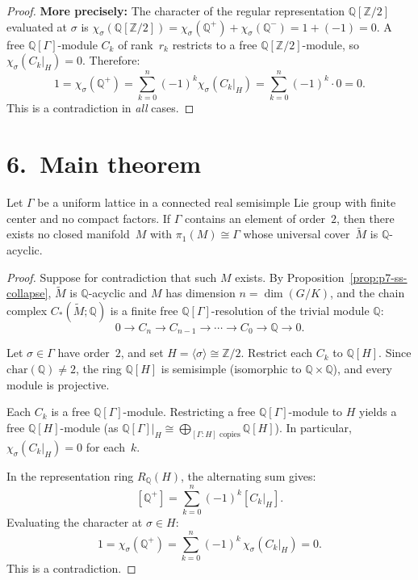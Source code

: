 \begin{proof}
\textbf{More precisely:} The character of the regular representation
$\mathbb{Q}[\mathbb{Z}/2]$ evaluated at $\sigma$ is
$\chi_\sigma(\mathbb{Q}[\mathbb{Z}/2]) = \chi_\sigma(\mathbb{Q}^+) +
\chi_\sigma(\mathbb{Q}^-) = 1 + (-1) = 0$. A free
$\mathbb{Q}[\Gamma]$-module $C_k$ of rank~$r_k$ restricts to a free
$\mathbb{Q}[\mathbb{Z}/2]$-module, so $\chi_\sigma(C_k|_H) = 0$. Therefore:
\[
  1 = \chi_\sigma(\mathbb{Q}^+)
  = \sum_{k=0}^n (-1)^k \chi_\sigma(C_k|_H)
  = \sum_{k=0}^n (-1)^k \cdot 0 = 0.
\]
This is a contradiction in \emph{all} cases.
\end{proof}

\section*{6.\ Main theorem}
\label{sec:p7-main}

\begin{theorem}
\label{thm:p7-main}
Let $\Gamma$ be a uniform lattice in a connected real semisimple Lie group
with finite center and no compact factors. If $\Gamma$ contains an element of
order~$2$, then there exists no closed manifold~$M$ with
$\pi_1(M)\cong\Gamma$ whose universal cover~$\widetilde{M}$ is
$\mathbb{Q}$-acyclic.
\end{theorem}

\begin{proof}
Suppose for contradiction that such $M$ exists. By
Proposition~\ref{prop:p7-ss-collapse}, $\widetilde{M}$ is
$\mathbb{Q}$-acyclic and $M$ has dimension $n=\dim(G/K)$, and the chain
complex $C_*(\widetilde{M};\mathbb{Q})$ is a finite free
$\mathbb{Q}[\Gamma]$-resolution of the trivial module $\mathbb{Q}$:
\[
  0 \to C_n \to C_{n-1} \to \cdots \to C_0 \to \mathbb{Q} \to 0.
\]

Let $\sigma\in\Gamma$ have order~$2$, and set $H=\langle\sigma\rangle\cong
\mathbb{Z}/2$.  Restrict each $C_k$ to $\mathbb{Q}[H]$. Since
$\mathrm{char}(\mathbb{Q})\ne 2$, the ring $\mathbb{Q}[H]$ is semisimple
(isomorphic to $\mathbb{Q}\times\mathbb{Q}$), and every module is projective.

Each $C_k$ is a free $\mathbb{Q}[\Gamma]$-module. Restricting a free
$\mathbb{Q}[\Gamma]$-module to $H$ yields a free $\mathbb{Q}[H]$-module (as
$\mathbb{Q}[\Gamma]|_H\cong\bigoplus_{[\Gamma:H]\text{ copies}}\mathbb{Q}[H]$).
In particular, $\chi_\sigma(C_k|_H)=0$ for each~$k$.

In the representation ring $R_\mathbb{Q}(H)$, the alternating sum gives:
\[
  [\mathbb{Q}^+]
  = \sum_{k=0}^n (-1)^k [C_k|_H].
\]
Evaluating the character at $\sigma\in H$:
\[
  1 = \chi_\sigma(\mathbb{Q}^+) = \sum_{k=0}^n (-1)^k\,\chi_\sigma(C_k|_H) = 0.
\]
This is a contradiction.
\end{proof}

